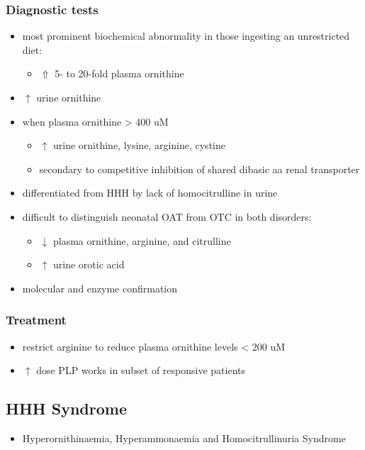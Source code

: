 \documentclass{scrartcl}
\begin{document}
\subsubsection{Diagnostic tests}
\label{sec:org13ab1e9}
\begin{itemize}
\item most prominent biochemical abnormality in those ingesting an
unrestricted diet:
\begin{itemize}
\item \(\Uparrow\) 5- to 20-fold plasma ornithine
\end{itemize}
\item \(\uparrow\) urine ornithine
\item when plasma ornithine \textgreater{} 400 uM
\begin{itemize}
\item \(\uparrow\) urine ornithine, lysine, arginine, cystine
\item secondary to competitive inhibition of shared dibasic aa renal transporter
\end{itemize}
\item differentiated from HHH by lack of homocitrulline in urine
\item difficult to distinguish neonatal OAT from OTC in both disorders:
\begin{itemize}
\item \(\downarrow\) plasma ornithine, arginine, and citrulline
\item \(\uparrow\) urine orotic acid
\end{itemize}
\item molecular and enzyme confirmation
\end{itemize}

\subsubsection{Treatment}
\label{sec:orgd06f43e}
\begin{itemize}
\item restrict arginine to reduce plasma ornithine levels \textless{} 200 uM
\item \(\uparrow\) dose PLP works in subset of responsive patients
\end{itemize}

\subsection{HHH Syndrome}
\label{sec:org7dd324d}
\begin{itemize}
\item Hyperornithinaemia, Hyperammonaemia and Homocitrullinuria Syndrome
\end{itemize}
\end{document}
